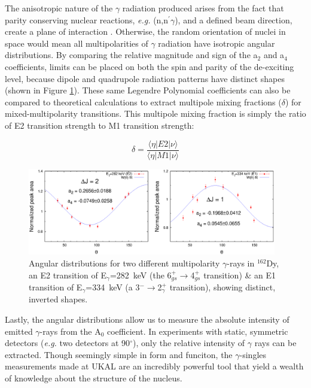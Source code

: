 The anisotropic nature of the $\gamma$ radiation produced arises from the fact that parity conserving nuclear reactions, \textit{e.g.} (n,n$^{\prime}\gamma$), and a defined beam direction, create a plane of interaction . Otherwise, the random orientation of nuclei in space would mean all multipolarities of $\gamma$ radiation  have isotropic angular distributions. By comparing the relative magnitude and sign of the a$_2$ and a$_4$ coefficients, limits can be placed on both the spin and parity of the de-exciting level, because dipole and quadrupole radiation patterns have distinct shapes (shown in Figure \ref{fig:multipole_diff}). These same Legendre Polynomial coefficients can also be compared to theoretical calculations to extract multipole mixing fractions ($\delta$) for mixed-multipolarity transitions. This multipole mixing fraction is simply the ratio of E2 transition strength to M1 transition strength:

\begin{equation} \label{eq:multipolemixing}
\delta=\frac{\langle\eta\vert E2 \vert\nu\rangle}{\langle\eta\vert M1 \vert\nu\rangle}
\end{equation}

\begin{figure}[h] 
\begin{center}
\includegraphics[width=0.97\textwidth]{multipole_diff.eps}
\caption{Angular distributions for two different multipolarity $\gamma$-rays in $^{162}$Dy, an E2 transition of E$_\gamma$=282~keV (the 6$^+_{gs}\rightarrow$4$^+_{gs}$ transition) \& an E1 transition of E$_\gamma$=334~keV (a 3$^-\rightarrow$2$^+_\gamma$ transition), showing distinct, inverted shapes.}
\label{fig:multipole_diff}
\end{center}
\end{figure}

Lastly, the angular distributions allow us to measure the absolute intensity of emitted $\gamma$-rays from the A$_0$ coefficient. In experiments with static, symmetric detectors (\textit{e.g.} two detectors at 90$^{\circ}$), only the relative intensity of $\gamma$ rays can be extracted. Though seemingly simple in form and funciton, the $\gamma$-singles measurements made at UKAL are an incredibly powerful tool that yield a wealth of knowledge about the structure of the nucleus.

